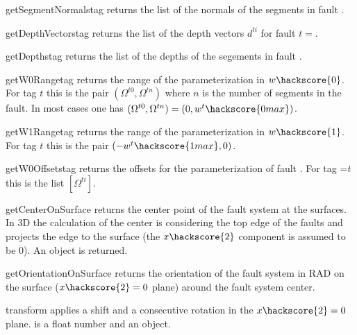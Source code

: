 \begin{methoddesc}[FaultSystem]{getSegmentNormals}{tag}
returns the list of the normals of the segments in fault .
\end{methoddesc}

\begin{methoddesc}[FaultSystem]{getDepthVectors}{tag}
returns the list of the depth vectors $d^{ti}$ for fault $t=$.
\end{methoddesc}

\begin{methoddesc}[FaultSystem]{getDepths}{tag}
returns the list of the depths of the segements in fault .
\end{methoddesc}

\begin{methoddesc}[FaultSystem]{getW0Range}{tag}
returns the range of the parameterization in $w\hackscore{0}$.
For tag $t$ this is the pair $(\Omega^{t0},\Omega^{tn})$ where $n$ is the number of segments in the fault.
In most cases one has $(\Omega^{t0},\Omega^{tn})=(0,w^t\hackscore{0 max})$.
\end{methoddesc}

\begin{methoddesc}[FaultSystem]{getW1Range}{tag}
returns the range of the parameterization in  $w\hackscore{1}$.
For tag $t$ this is the pair $(-w^t\hackscore{1max},0)$.
\end{methoddesc}

\begin{methoddesc}[FaultSystem]{getW0Offsets}{tag}
returns the offsets for the parameterization of fault .
For tag =$t$ this is the list $[\Omega^{ti}]$.
\end{methoddesc}

\begin{methoddesc}[FaultSystem]{getCenterOnSurface}{}
returns the center point of the fault system at the surfaces. In 3D the calculation of the center is
considering the top edge of the faults and projects the edge to the surface (the $x\hackscore{2}$ component is assumed to be 0). An \numpyNDA object is returned.
\end{methoddesc}

\begin{methoddesc}[FaultSystem]{getOrientationOnSurface}{}
returns the orientation of the fault system in RAD on the surface ($x\hackscore{2}=0$ plane) around the fault system center.
\end{methoddesc}
\begin{methoddesc}[FaultSystem]{transform}{}
applies a shift  and a consecutive rotation in the $x\hackscore{2}=0$ plane.
 is a float number and  an \numpyNDA object.
\end{methoddesc}

